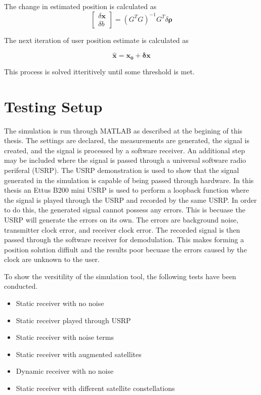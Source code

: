 \documentclass[12pt]{report}
\begin{document}
The change in estimated position is calculated as 
\begin{equation}
    \begin{bmatrix}
        \delta \mathbf{x} \\
        \delta b
    \end{bmatrix}
    = (G^TG)^{-1}G^T\delta \mathbf{\rho}
\end{equation}

The next iteration of user position estimate is calculated as 

\begin{equation}
\hat{\mathbf{x}} = \mathbf{x_0} + \mathbf{\delta x}
\end{equation}

This process is solved itteritively until some threshold is met.

\section{Testing Setup}
The simulation is run through MATLAB as described at the begining of this thesis. The settings are declared, the measurements are generated, the signal is created, and the signal is processed by a software receiver. An additional step may be included where the signal is passed through a universal software radio periferal (USRP). The USRP demonstration is used to show that the signal generated in the simulation is capable of being passed through hardware. In this thesis an Ettus B200 mini USRP is used to perform a loopback function where the signal is played through the USRP and recorded by the same USRP. In order to do this, the generated signal cannot possess any errors. This is becuase the USRP will generate the errors on its own. The errors are background noise, transmitter clock error, and receiver clock error. The recorded signal is then passed through the software receiver for demodulation. This makes forming a position solution diffiult and the results poor becuase the errors caused by the clock are unknown to the user. 

To show the versitility of the simulation tool, the following tests have been conducted.

\begin{itemize}
    \item Static receiver with no noise
    \item Static receiver played through USRP
    \item Static receiver with noise terms
    \item Static receiver with augmented satellites
    \item Dynamic receiver with no noise
    \item Static receiver with different satellite constellations
\end{itemize}
\end{document}
